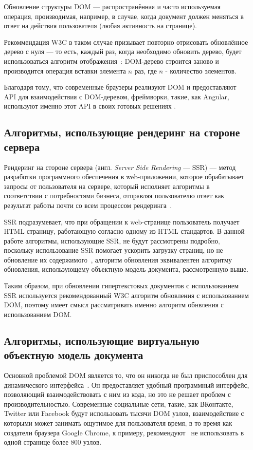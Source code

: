 Обновление структуры DOM --- распространённая и часто используемая операция, производимая, например, в случае, когда документ должен меняться в ответ на действия пользователя (любая активность на странице).

Рекоммендация W3C в таком случае призывает повторно отрисовать обновлённое дерево с нуля --- то есть, каждый раз, когда необходимо обновить дерево, будет использоваться алгоритм отображения~\cite{reflow}: DOM-дерево строится заново и производится операция вставки элемента $n$ раз, где $n$ - количество элементов.

Благодаря тому, что современные браузеры реализуют DOM и предоставляют API для взаимодействия с DOM-деревом, фреймворки, такие, как Angular, используют именно этот API в своих готовых решениях \cite{angular}. 

\subsection{Алгоритмы, использующие рендеринг на стороне сервера}

Рендеринг на стороне сервера (англ. \textit{Server Side Rendering} --- SSR) --- метод разработки программного обеспечения в web-приложении, которое обрабатывает запросы от пользователя на сервере, который исполняет алгоритмы в соответствии с потребностями бизнеса, отправляя пользователю ответ как результат работы почти со всем процессом рендеринга~\cite{ssr}.

SSR подразумевает, что при обращении к web-странице пользователь получает HTML страницу, работающую согласно одному из HTML стандартов. В данной работе алгоритмы, использующие SSR, не будут рассмотрены подробно, поскольку использование SSR помогает ускорить загрузку страниц, но не обновление их содержимого~\cite{ssr}, алгоритм обновления эквивалентен алгоритму обновления, использующему объектную модель документа, рассмотренную выше. 

Таким образом, при обновлении гипертекстовых документов с использованием SSR используется рекомендованный W3C алгоритм обновления с использованием DOM, поэтому имеет смысл рассматривать именно алгоритм обнвления с использованием DOM.

\subsection{Алгоритмы, использующие виртуальную объектную модель документа}

Основной проблемой DOM является то, что он никогда не был приспособлен для динамического интерфейса~\cite{not-dynamic}.
Он предоставляет удобный программный интерфейс, позволяющий взаимодействовать с ним из кода, но это не решает проблем с производительностью.
Современные социальные сети, такие, как ВКонтакте, Twitter или Facebook будут использовать тысячи DOM узлов, взаимодействие с которыми может занимать ощутимое для пользователя время, в то время как создатели браузера Google Chrome, к примеру, рекомендуют~\cite{dom-max} не использовать в одной странице более 800 узлов.

